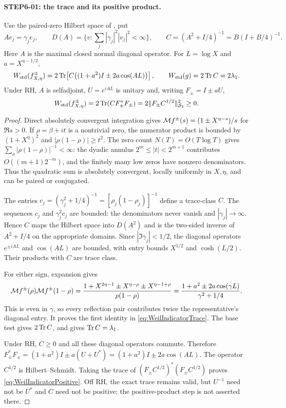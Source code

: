 \paragraph{STEP6-01: the trace and its positive product.}
Use the paired-zero Hilbert space of , put
\[
 Ae_j=\gamma_je_j,\qquad
 D(A)=\{v:\sum_j|\gamma_j|^2|v_j|^2<\infty\},\qquad
 C=(A^2+I/4)^{-1}=B(I+B/4)^{-1}.
\]
Here $A$ is the maximal closed normal diagonal operator. For $L=\log X$ and $a=X^{\eta-1/2}$,
\begin{equation}\label{eq:WeilIndicatorTrace}
 W_{\rm std}(f^\pm_{X,\eta})
 =2\operatorname{Tr}\!\left[C\bigl((1+a^2)I\pm2a\cos(AL)\bigr)\right],
 \qquad W_{\rm std}(g)=2\operatorname{Tr} C=2\lambda_1.
\end{equation}
Under RH, $A$ is selfadjoint, $U=e^{iAL}$ is unitary and, writing $F_\pm=I\pm aU$,
\begin{equation}\label{eq:WeilIndicatorPositive}
 W_{\rm std}(f^\pm_{X,\eta})
 =2\operatorname{Tr}(CF_\pm^*F_\pm)
 =2\|F_\pm C^{1/2}\|_{\mathcal S_2}^{2}\ge0.
\end{equation}
\begin{proof}
Direct absolutely convergent integration gives $\mathcal M f^\pm(s)=(1\pm X^{\eta-s})/s$ for $\Re s>0$. If $\rho=\beta+it$ is a nontrivial zero, the numerator product is bounded by $(1+X^\eta)^2$ and $|\rho(1-\rho)|\ge t^2$. The zero count $N(T)=O(T\log T)$ gives
$\sum_\rho|\rho(1-\rho)|^{-1}<\infty$: the dyadic annulus $2^m\le|t|<2^{m+1}$ contributes $O((m+1)2^{-m})$, and the finitely many low zeros have nonzero denominators. Thus the quadratic sum is absolutely convergent, locally uniformly in $X,\eta$, and can be paired or conjugated.

The entries $c_j=(\gamma_j^2+1/4)^{-1}=[\rho_j(1-\rho_j)]^{-1}$ define a trace-class $C$. The sequences $c_j$ and $\gamma_j^2c_j$ are bounded: the denominators never vanish and $|\gamma_j|\to\infty$. Hence $C$ maps the Hilbert space into $D(A^2)$ and is the two-sided inverse of $A^2+I/4$ on the appropriate domains. Since $|\Im\gamma_j|<1/2$, the diagonal operators $e^{\pm iAL}$ and $\cos(AL)$ are bounded, with entry bounds $X^{1/2}$ and $\cosh(L/2)$. Their products with $C$ are trace class.

For either sign, expansion gives
\[
 \mathcal M f^\pm(\rho)\mathcal M f^\pm(1-\rho)
 =\frac{1+X^{2\eta-1}\pm X^{\eta-\rho}\pm X^{\eta-1+\rho}}
 {\rho(1-\rho)}
 =\frac{1+a^2\pm2a\cos(\gamma L)}{\gamma^2+1/4}.
\]
This is even in $\gamma$, so every reflection pair contributes twice the representative's diagonal entry. It proves the first identity in \eqref{eq:WeilIndicatorTrace}. The base test gives $2\operatorname{Tr} C$, and  gives $\operatorname{Tr} C=\lambda_1$.

Under RH, $C\ge0$ and all these diagonal operators commute. Therefore
$F_\pm^*F_\pm=(1+a^2)I\pm a(U+U^*)=(1+a^2)I\pm2a\cos(AL)$.
The operator $C^{1/2}$ is Hilbert--Schmidt. Taking the trace of
$(F_\pm C^{1/2})^*(F_\pm C^{1/2})$ proves \eqref{eq:WeilIndicatorPositive}. Off RH, the exact trace remains valid, but $U^{-1}$ need not be $U^*$ and $C$ need not be positive; the positive-product step is not asserted there.
\end{proof}

